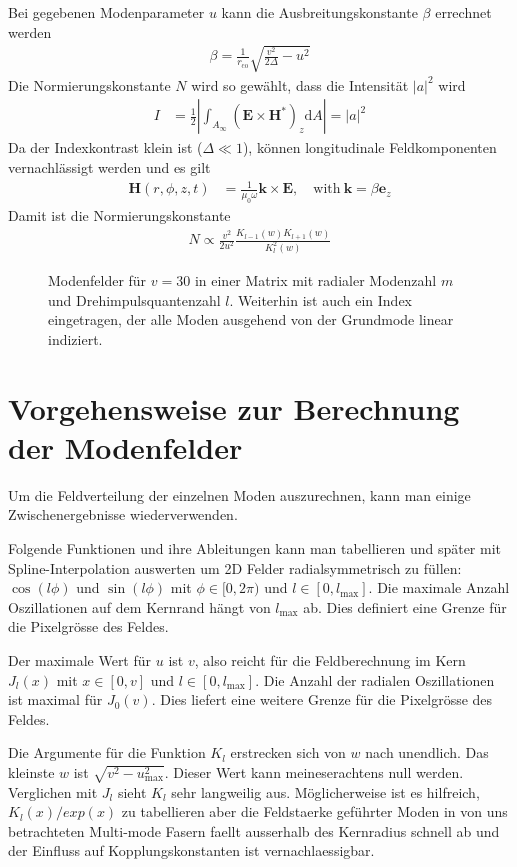 \documentclass[DIV19,twocolumn]{scrartcl}
\newcommand{\vect}[1]{\mathbf{#1}}
\def\k{\vect k}
\def\e{\vect e}
\def\E{\vect E}
\def\H{\vect H}
\def\({\left(}
\def\){\right)}
\newcommand{\rco}{r_\textrm{co}}
\newcommand{\lmax}{l_\textrm{max}}
\newcommand{\umax}{u_\textrm{max}}
\def\svgending{\ifx\pdfoutput\undefined%
  .eps_tex%
  \else%
  .pdf_tex%
  \fi}
\newcommand{\svginput}[2]{{\def\svgscale{#1}}}
\begin{document}
Bei gegebenen Modenparameter $u$ kann die Ausbreitungskonstante $\beta$ errechnet werden
\begin{align}
\beta = \frac{1}{\rco} \sqrt{\frac{v^2}{2\Delta} - u^2}
\end{align}
Die Normierungskonstante $N$ wird so gew\"ahlt, dass die Intensit\"at
$|a|^2$ wird
\begin{align}
  I &= \frac{1}{2}\left|\int_{A_\infty} \(\E\times\H^*\)_z  \textrm{d}A \right| = |a|^2
\end{align}
Da der Indexkontrast klein ist ($\Delta \ll 1$), k\"onnen longitudinale Feldkomponenten vernachl\"assigt werden und es gilt
\begin{align}
  \H(r,\phi,z,t) &= \frac{1}{\mu_0 \omega} \k \times \E, \quad\textrm{with}\ \k = \beta \e_z
\end{align}
Damit ist die Normierungskonstante 
\begin{align}
  N \propto \frac{v^2}{2 u^2} \frac{K_{l-1}(w)K_{l+1}(w)}{K_l^2(w)}
\end{align}

\begin{figure}[hbtp]
  \centering
  \svginput{1}{modes}
  \caption{Modenfelder f\"ur $v=30$ in einer Matrix mit radialer
    Modenzahl $m$ und Drehimpulsquantenzahl $l$. Weiterhin ist auch
    ein Index eingetragen, der alle Moden ausgehend von der Grundmode
    linear indiziert.}
  \label{fig:fields}
\end{figure}
\section{Vorgehensweise zur Berechnung der Modenfelder}
Um die Feldverteilung der einzelnen Moden auszurechnen, kann man
einige Zwischenergebnisse wiederverwenden.

Folgende Funktionen und ihre Ableitungen kann man tabellieren und
sp\"ater mit Spline-Interpolation auswerten um 2D Felder
radialsymmetrisch zu f\"ullen: $\cos(l\phi)$ und $\sin(l\phi)$ mit
$\phi\in[0,2\pi)$ und $l\in[0,\lmax]$. Die maximale Anzahl
  Oszillationen auf dem Kernrand h\"angt von $\lmax$ ab. Dies
  definiert eine Grenze f\"ur die Pixelgr\"osse des Feldes.

Der maximale Wert f\"ur $u$ ist $v$, also reicht f\"ur die
Feldberechnung im Kern $J_l(x)$ mit $x\in[0,v]$ und $l\in[0,\lmax]$.
Die Anzahl der radialen Oszillationen ist maximal f\"ur $J_0(v)$. Dies
liefert eine weitere Grenze f\"ur die Pixelgr\"osse des Feldes.

Die Argumente f\"ur die Funktion $K_l$ erstrecken sich von $w$ nach
unendlich. Das kleinste $w$ ist $\sqrt{v^2-\umax^2}$. Dieser Wert kann
meineserachtens null werden. Verglichen mit $J_l$ sieht $K_l$ sehr
langweilig aus. M\"oglicherweise ist es hilfreich, $K_l(x)/exp(x)$ zu
tabellieren aber die Feldstaerke gef\"uhrter Moden in von uns
betrachteten Multi-mode Fasern faellt ausserhalb des Kernradius
schnell ab und der Einfluss auf Kopplungskonstanten ist
vernachlaessigbar.
\end{document}
